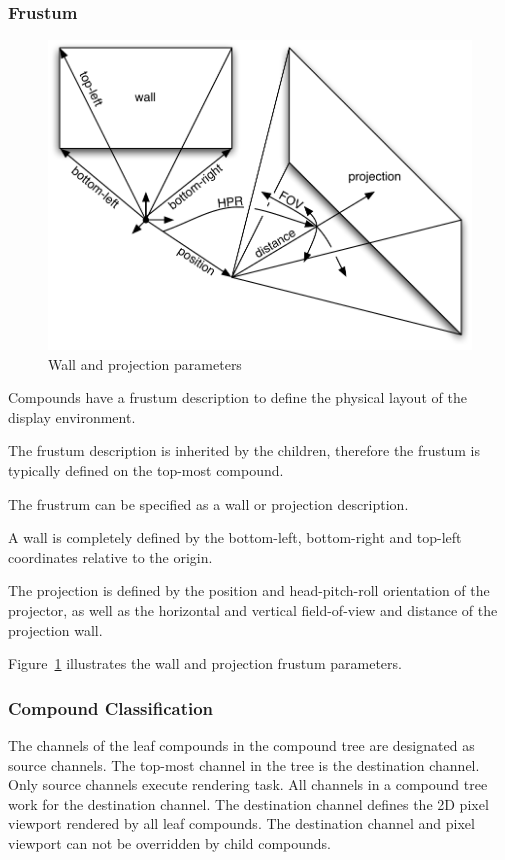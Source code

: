 \documentclass[10pt,a4]{scrartcl}
\newcommand{\fig}[1]{Figure~\ref{#1}}
\begin{document}
\subsubsection{Frustum}
\begin{figure}
  \includegraphics[width=.618\textwidth]{images/frustra.pdf}
  {\caption{\small\label{fFrustra}Wall and projection parameters}}
\end{figure}
Compounds have a frustum description to define the physical layout of
the display environment. 

The frustum description is inherited by the children, therefore the
frustum is typically defined on the top-most compound. 

The frustrum can be specified as a wall or projection description. 

A wall is completely defined by the bottom-left, bottom-right and
top-left coordinates relative to the origin. 

The projection is defined by the position and head-pitch-roll
orientation of the projector, as well as the horizontal and vertical
field-of-view and distance of the projection wall. 

\fig{fFrustra} illustrates the wall and projection frustum parameters.

\subsubsection{Compound Classification}
The channels of the leaf compounds in the compound tree are designated
as source channels. The top-most channel in the tree is the destination
channel. Only source channels execute rendering task. All channels in a
compound tree work for the destination channel. The destination channel
defines the 2D pixel viewport rendered by all leaf compounds. The
destination channel and pixel viewport can not be overridden by child
compounds.
\end{document}
